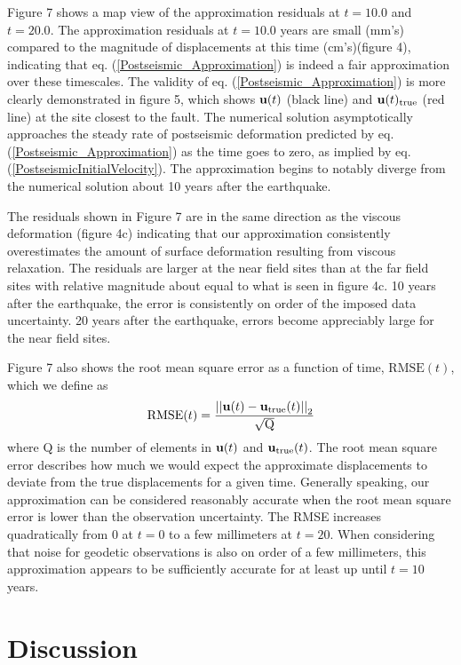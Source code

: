 \documentclass[12pt]{article}
\begin{document}
Figure 7 shows a map view of the approximation residuals at $t=10.0$
and $t=20.0$.  The approximation residuals at $t=10.0$ years are small
(mm's) compared to the magnitude of displacements at this time
(cm's)(figure 4), indicating that
eq. (\ref{Postseismic_Approximation}) is indeed a fair approximation
over these timescales.  The validity of
eq. (\ref{Postseismic_Approximation}) is more clearly demonstrated in
figure 5, which shows $\bold{u}(t)$ (black line) and
$\bold{u}(t)_{\mathrm{true}}$ (red line) at the site closest to the
fault.  The numerical solution asymptotically approaches the steady
rate of postseismic deformation predicted by
eq. (\ref{Postseismic_Approximation}) as the time goes to zero, as
implied by eq. (\ref{PostseismicInitialVelocity}).  The approximation
begins to notably diverge from the numerical solution about 10 years
after the earthquake.

The residuals shown in Figure 7 are in the same direction
as the viscous deformation (figure 4c) indicating that our
approximation consistently overestimates the amount of surface
deformation resulting from viscous relaxation.  The residuals are
larger at the near field sites than at the far field sites with
relative magnitude about equal to what is seen in figure 4c.  10 years
after the earthquake, the error is consistently on order of the
imposed data uncertainty.  20 years after the earthquake, errors
become appreciably large for the near field sites.

Figure 7 also shows the root mean square error as
a function of time, $\mathrm{RMSE}(t)$, which we define as
\begin{equation}
  \mathrm{RMSE}(t) = \frac{\left|\left|\bold{u}(t) -
    \bold{u}_{\mathrm{true}}(t)\right|\right|_2}{\sqrt{\mathrm{Q}}}
\end{equation}
where Q is the number of elements in $\bold{u}(t)$ and
$\bold{u}_{\mathrm{true}}(t)$.  The root mean square error describes
how much we would expect the approximate displacements to deviate from
the true displacements for a given time.  Generally speaking, our
approximation can be considered reasonably accurate when the root mean square error
is lower than the observation uncertainty.  The RMSE increases
quadratically from 0 at $t=0$ to a few millimeters at $t=20$.  When
considering that noise for geodetic observations is also on order of a
few millimeters, this approximation appears to be sufficiently
accurate for at least up until $t=10$ years.


\section{Discussion}
\end{document}
